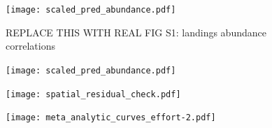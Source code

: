 \documentclass[12pt]{article}
\renewcommand{\figurename}{Figure}
\begin{document}
\renewcommand{\thefigure}{S\arabic{figure}}
\renewcommand{\figurename}{Figure}
\setcounter{figure}{0}  %

\begin{figure}[htbp]
  \centering
    \texttt{[image: scaled\_pred\_abundance.pdf]}
  \caption{REPLACE THIS WITH REAL FIG S1: landings abundance correlations}
  \label{fig:ind.predators.corrs.pdf}
\end{figure}

\begin{figure}[htbp]
  \centering
    \texttt{[image: scaled\_pred\_abundance.pdf]}
  \caption{}
  \label{fig:ind.predators.corrs.pdf}
\end{figure}

\begin{figure}[htbp]
  \centering
    \texttt{[image: spatial\_residual\_check.pdf]}
  \caption{}
  \label{fig:ind.predators.corrs.pdf}
\end{figure}

\begin{figure}[htbp]
  \centering
    \texttt{[image: meta\_analytic\_curves\_effort-2.pdf]}
  \caption{}
  \label{fig:effort2}
\end{figure}






%
\end{document}

